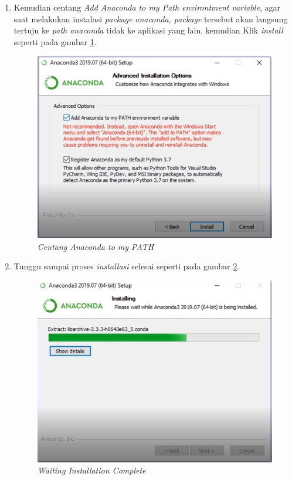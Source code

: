 \begin{enumerate}
\item Kemudian centang \textit{Add Anaconda to my Path environtment variable}, agar saat melakukan instalasi  \textit{package anaconda, package} tersebut akan langsung tertuju ke \textit{path anaconda} tidak ke aplikasi yang lain. kemudian Klik \textit{install} seperti pada gambar \ref{Figureanaconda6}.

\begin{figure}[H]
    \centering
    \includegraphics[scale=0.75]{figures/7}
    \caption{\textit{Centang Anaconda to my PATH}}
    \label{Figureanaconda6}
\end{figure}

\item Tunggu sampai proses \textit{installasi} selesai seperti pada gambar \ref{Figureanaconda7}.

\begin{figure}[H]
    \centering
    \includegraphics[scale=0.75]{figures/8}
    \caption{\textit{Waiting Installation Complete}}
    \label{Figureanaconda7}
\end{figure}


\end{enumerate}
